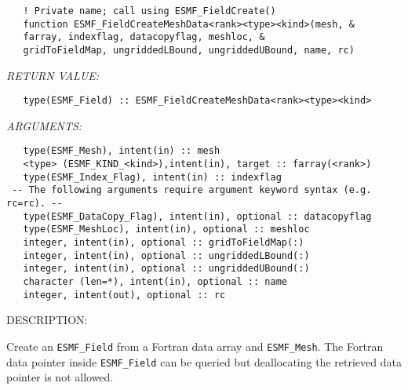    
\begin{verbatim}   ! Private name; call using ESMF_FieldCreate() 
   function ESMF_FieldCreateMeshData<rank><type><kind>(mesh, & 
   farray, indexflag, datacopyflag, meshloc, & 
   gridToFieldMap, ungriddedLBound, ungriddedUBound, name, rc) 
   \end{verbatim}{\em RETURN VALUE:}
\begin{verbatim}   type(ESMF_Field) :: ESMF_FieldCreateMeshData<rank><type><kind> 
   \end{verbatim}{\em ARGUMENTS:}
\begin{verbatim}   type(ESMF_Mesh), intent(in) :: mesh 
   <type> (ESMF_KIND_<kind>),intent(in), target :: farray(<rank>) 
   type(ESMF_Index_Flag), intent(in) :: indexflag 
 -- The following arguments require argument keyword syntax (e.g. rc=rc). --
   type(ESMF_DataCopy_Flag), intent(in), optional :: datacopyflag 
   type(ESMF_MeshLoc), intent(in), optional :: meshloc 
   integer, intent(in), optional :: gridToFieldMap(:) 
   integer, intent(in), optional :: ungriddedLBound(:) 
   integer, intent(in), optional :: ungriddedUBound(:) 
   character (len=*), intent(in), optional :: name 
   integer, intent(out), optional :: rc 
   \end{verbatim}
{\sf DESCRIPTION:\\ }

 
   Create an {\tt ESMF\_Field} from a Fortran data array and {\tt ESMF\_Mesh}. 
   The Fortran data pointer inside {\tt ESMF\_Field} can be queried but deallocating 
   the retrieved data pointer is not allowed. 
   
